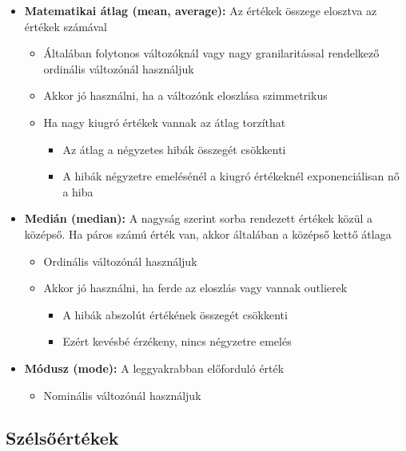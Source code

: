 \documentclass[
  letterpaper,
  DIV=11,
  numbers=noendperiod]{scrreprt}
\providecommand{\tightlist}{%
  \setlength{\itemsep}{0pt}\setlength{\parskip}{0pt}}\usepackage{longtable,booktabs,array}
\begin{document}
\begin{itemize}
\item
  \textbf{Matematikai átlag (mean, average):} Az értékek összege
  elosztva az értékek számával

  \begin{itemize}
  \item
    Általában folytonos változóknál vagy nagy granilaritással rendelkező
    ordinális változónál használjuk
  \item
    Akkor jó használni, ha a változónk eloszlása szimmetrikus
  \item
    Ha nagy kiugró értékek vannak az átlag torzíthat

    \begin{itemize}
    \item
      Az átlag a négyzetes hibák összegét csökkenti
    \item
      A hibák négyzetre emelésénél a kiugró értékeknél exponenciálisan
      nő a hiba
    \end{itemize}
  \end{itemize}
\item
  \textbf{Medián (median):} A nagyság szerint sorba rendezett értékek
  közül a középső. Ha páros számú érték van, akkor általában a középső
  kettő átlaga

  \begin{itemize}
  \item
    Ordinális változónál használjuk
  \item
    Akkor jó használni, ha ferde az eloszlás vagy vannak outlierek

    \begin{itemize}
    \item
      A hibák abszolút értékének összegét csökkenti
    \item
      Ezért kevésbé érzékeny, nincs négyzetre emelés
    \end{itemize}
  \end{itemize}
\item
  \textbf{Módusz (mode):} A leggyakrabban előforduló érték

  \begin{itemize}
  \tightlist
  \item
    Nominális változónál használjuk
  \end{itemize}
\end{itemize}

\hypertarget{szuxe9lsux151uxe9rtuxe9kek}{%
\subsection{Szélsőértékek}\label{szuxe9lsux151uxe9rtuxe9kek}}
\end{document}
